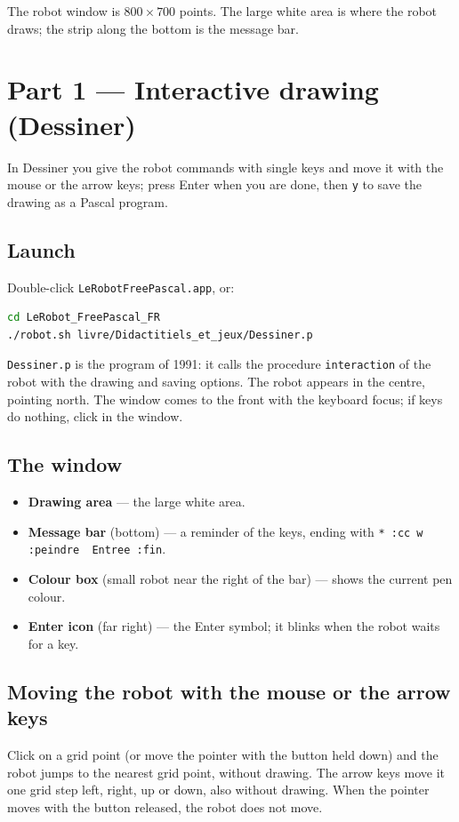 \documentclass[11pt,a4paper]{article}
\newcommand{\kbd}[1]{\texttt{#1}}
\begin{document}
The robot window is $800 \times 700$ points. The large white area is where
the robot draws; the strip along the bottom is the message bar.

\section{Part 1 --- Interactive drawing (Dessiner)}

In Dessiner you give the robot commands with single keys and move it with
the mouse or the arrow keys; press Enter when you are done, then \kbd{y} to
save the drawing as a Pascal program.

\subsection{Launch}
Double-click \kbd{LeRobotFreePascal.app}, or:
\begin{lstlisting}[language=bash]
cd LeRobot_FreePascal_FR
./robot.sh livre/Didactitiels_et_jeux/Dessiner.p
\end{lstlisting}
\kbd{Dessiner.p} is the program of 1991: it calls the procedure
\kbd{interaction} of the robot with the drawing and saving options. The
robot appears in the centre, pointing north. The window comes to the front
with the keyboard focus; if keys do nothing, click in the window.

\subsection{The window}
\begin{itemize}
\item \textbf{Drawing area} --- the large white area.
\item \textbf{Message bar} (bottom) --- a reminder of the keys, ending with
  \kbd{* :cc w :peindre\ \ Entree :fin}.
\item \textbf{Colour box} (small robot near the right of the bar) --- shows
  the current pen colour.
\item \textbf{Enter icon} (far right) --- the Enter symbol; it blinks when
  the robot waits for a key.
\end{itemize}

\subsection{Moving the robot with the mouse or the arrow keys}
Click on a grid point (or move the pointer with the button held down) and
the robot jumps to the nearest grid point, without drawing. The arrow keys
move it one grid step left, right, up or down, also without drawing. When
the pointer moves with the button released, the robot does not move.
\end{document}
